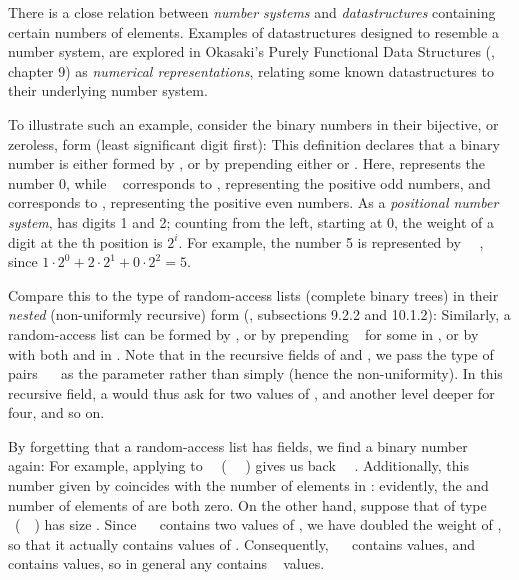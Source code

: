 There is a close relation between \emph{number systems} and \emph{datastructures} containing certain numbers of elements. Examples of datastructures designed to resemble a number system, are explored in Okasaki's Purely Functional Data Structures (\cite{purelyfunctional}, chapter 9) as \emph{numerical representations}, relating some known datastructures to their underlying number system.

To illustrate such an example, consider the binary numbers in their bijective, or zeroless, form (least significant digit first):
This definition declares that a binary number is either formed by , or by prepending either  or . Here,  represents the number 0, while \  corresponds to , representing the positive odd numbers, and  corresponds to , representing the positive even numbers. As a \emph{positional number system},  has digits 1 and 2; counting from the left, starting at 0, the weight of a digit at the th position is $2^i$. For example, the number 5 is represented by \ \ , since $1 \cdot 2^0 + 2 \cdot 2^1 + 0 \cdot 2^2 = 5$.

Compare this to the type of random-access lists (complete binary trees) in their \emph{nested} (non-uniformly recursive) form (\cite{purelyfunctional}, subsections 9.2.2 and 10.1.2):
Similarly, a random-access list can be formed by , or by prepending \  for some  in , or by \ \  with both  and  in . Note that in the recursive fields of  and , we pass the type of pairs \ \  as the parameter rather than simply  (hence the non-uniformity). In this recursive field, a  would thus ask for two values of , and another level deeper for four, and so on.

By forgetting that a random-access list  has fields, we find a binary number \  again:
For example, applying  to \ \AV{\_}\ (\ \AV{\_}\ \AV{\_} ) gives us back \ \ . Additionally, this number given by  coincides with the number of elements in : evidently, the  and number of elements of  are both zero. On the other hand, suppose that  of type \ (\ \ ) has size . Since \ \  contains two values of , we have doubled the weight of , so that it actually contains  values of . Consequently, \ \  contains  values, and \ \ \  contains  values, so in general any  contains \  values.

